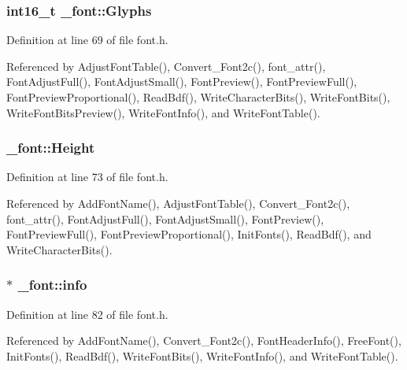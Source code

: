 \hypertarget{struct__font_a1e89c06fc11a730eb602522dc8953491}{
\subsubsection[{Glyphs}]{\setlength{\rightskip}{0pt plus 5cm}int16\-\_\-t \-\_\-font\-::\-Glyphs}}\label{struct__font_a1e89c06fc11a730eb602522dc8953491}


Definition at line 69 of file font.\-h.



Referenced by Adjust\-Font\-Table(), Convert\-\_\-\-Font2c(), font\-\_\-attr(), Font\-Adjust\-Full(), Font\-Adjust\-Small(), Font\-Preview(), Font\-Preview\-Full(), Font\-Preview\-Proportional(), Read\-Bdf(), Write\-Character\-Bits(), Write\-Font\-Bits(), Write\-Font\-Bits\-Preview(), Write\-Font\-Info(), and Write\-Font\-Table().

\hypertarget{struct__font_a5888921d1a78bf917351a275e2033467}{
\subsubsection[{Height}]{ \-\_\-font\-::\-Height}}\label{struct__font_a5888921d1a78bf917351a275e2033467}


Definition at line 73 of file font.\-h.



Referenced by Add\-Font\-Name(), Adjust\-Font\-Table(), Convert\-\_\-\-Font2c(), font\-\_\-attr(), Font\-Adjust\-Full(), Font\-Adjust\-Small(), Font\-Preview(), Font\-Preview\-Full(), Font\-Preview\-Proportional(), Init\-Fonts(), Read\-Bdf(), and Write\-Character\-Bits().

\hypertarget{struct__font_abf134e8a44e707d3b4e83ab76c952ed9}{
\subsubsection[{info}]{ $\ast$ \-\_\-font\-::info}}\label{struct__font_abf134e8a44e707d3b4e83ab76c952ed9}


Definition at line 82 of file font.\-h.



Referenced by Add\-Font\-Name(), Convert\-\_\-\-Font2c(), Font\-Header\-Info(), Free\-Font(), Init\-Fonts(), Read\-Bdf(), Write\-Font\-Bits(), Write\-Font\-Info(), and Write\-Font\-Table().


